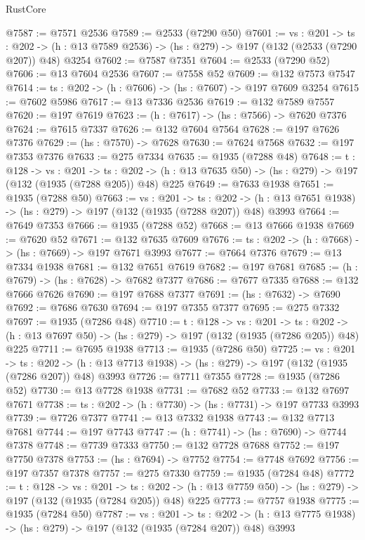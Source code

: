 \begin{lexlean}{RustCore}
\begin{coremodule}
@7587 := @7571 @2536
@7589 := @2533 (@7290 @50)
@7601 := {vs : @201} ->
  {ts : @202} -> (h : @13 @7589 @2536) -> (hs : @279) -> @197 (@132 (@2533 (@7290 @207)) @48) @3254
@7602 := @7587 @7351
@7604 := @2533 (@7290 @52)
@7606 := @13 @7604 @2536
@7607 := @7558 @52
@7609 := @132 @7573 @7547
@7614 := {ts : @202} -> (h : @7606) -> (hs : @7607) -> @197 @7609 @3254
@7615 := @7602 @5986
@7617 := @13 @7336 @2536
@7619 := @132 @7589 @7557
@7620 := @197 @7619
@7623 := (h : @7617) -> (hs : @7566) -> @7620 @7376
@7624 := @7615 @7337
@7626 := @132 @7604 @7564
@7628 := @197 @7626 @7376
@7629 := (hs : @7570) -> @7628
@7630 := @7624 @7568
@7632 := @197 @7353 @7376
@7633 := @275 @7334
@7635 := @1935 (@7288 @48)
@7648 := {t : @128} ->
  {vs : @201} ->
  {ts : @202} -> (h : @13 @7635 @50) -> (hs : @279) -> @197 (@132 (@1935 (@7288 @205)) @48) @225
@7649 := @7633 @1938
@7651 := @1935 (@7288 @50)
@7663 := {vs : @201} ->
  {ts : @202} -> (h : @13 @7651 @1938) -> (hs : @279) -> @197 (@132 (@1935 (@7288 @207)) @48) @3993
@7664 := @7649 @7353
@7666 := @1935 (@7288 @52)
@7668 := @13 @7666 @1938
@7669 := @7620 @52
@7671 := @132 @7635 @7609
@7676 := {ts : @202} -> (h : @7668) -> (hs : @7669) -> @197 @7671 @3993
@7677 := @7664 @7376
@7679 := @13 @7334 @1938
@7681 := @132 @7651 @7619
@7682 := @197 @7681
@7685 := (h : @7679) -> (hs : @7628) -> @7682 @7377
@7686 := @7677 @7335
@7688 := @132 @7666 @7626
@7690 := @197 @7688 @7377
@7691 := (hs : @7632) -> @7690
@7692 := @7686 @7630
@7694 := @197 @7355 @7377
@7695 := @275 @7332
@7697 := @1935 (@7286 @48)
@7710 := {t : @128} ->
  {vs : @201} ->
  {ts : @202} -> (h : @13 @7697 @50) -> (hs : @279) -> @197 (@132 (@1935 (@7286 @205)) @48) @225
@7711 := @7695 @1938
@7713 := @1935 (@7286 @50)
@7725 := {vs : @201} ->
  {ts : @202} -> (h : @13 @7713 @1938) -> (hs : @279) -> @197 (@132 (@1935 (@7286 @207)) @48) @3993
@7726 := @7711 @7355
@7728 := @1935 (@7286 @52)
@7730 := @13 @7728 @1938
@7731 := @7682 @52
@7733 := @132 @7697 @7671
@7738 := {ts : @202} -> (h : @7730) -> (hs : @7731) -> @197 @7733 @3993
@7739 := @7726 @7377
@7741 := @13 @7332 @1938
@7743 := @132 @7713 @7681
@7744 := @197 @7743
@7747 := (h : @7741) -> (hs : @7690) -> @7744 @7378
@7748 := @7739 @7333
@7750 := @132 @7728 @7688
@7752 := @197 @7750 @7378
@7753 := (hs : @7694) -> @7752
@7754 := @7748 @7692
@7756 := @197 @7357 @7378
@7757 := @275 @7330
@7759 := @1935 (@7284 @48)
@7772 := {t : @128} ->
  {vs : @201} ->
  {ts : @202} -> (h : @13 @7759 @50) -> (hs : @279) -> @197 (@132 (@1935 (@7284 @205)) @48) @225
@7773 := @7757 @1938
@7775 := @1935 (@7284 @50)
@7787 := {vs : @201} ->
  {ts : @202} -> (h : @13 @7775 @1938) -> (hs : @279) -> @197 (@132 (@1935 (@7284 @207)) @48) @3993

\end{coremodule}
\end{lexlean}
